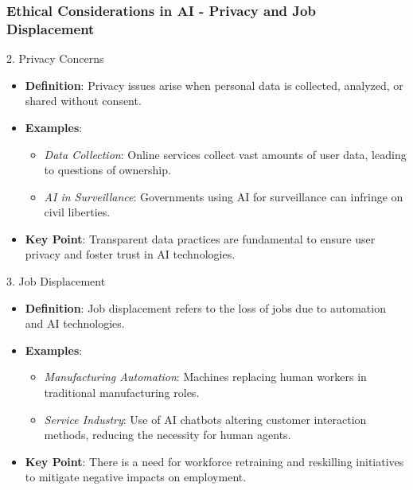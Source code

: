 \documentclass[aspectratio=169]{beamer}
\begin{document}
\begin{frame}[fragile]
    \frametitle{Ethical Considerations in AI - Privacy and Job Displacement}
    \begin{block}{2. Privacy Concerns}
        \begin{itemize}
            \item \textbf{Definition}: Privacy issues arise when personal data is collected, analyzed, or shared without consent.
            \item \textbf{Examples}:
            \begin{itemize}
                \item \textit{Data Collection}: Online services collect vast amounts of user data, leading to questions of ownership.
                \item \textit{AI in Surveillance}: Governments using AI for surveillance can infringe on civil liberties.
            \end{itemize}
            \item \textbf{Key Point}: Transparent data practices are fundamental to ensure user privacy and foster trust in AI technologies.
        \end{itemize}
    \end{block}

    \begin{block}{3. Job Displacement}
        \begin{itemize}
            \item \textbf{Definition}: Job displacement refers to the loss of jobs due to automation and AI technologies.
            \item \textbf{Examples}:
            \begin{itemize}
                \item \textit{Manufacturing Automation}: Machines replacing human workers in traditional manufacturing roles.
                \item \textit{Service Industry}: Use of AI chatbots altering customer interaction methods, reducing the necessity for human agents.
            \end{itemize}
            \item \textbf{Key Point}: There is a need for workforce retraining and reskilling initiatives to mitigate negative impacts on employment.
        \end{itemize}
    \end{block}
\end{frame}
\end{document}
